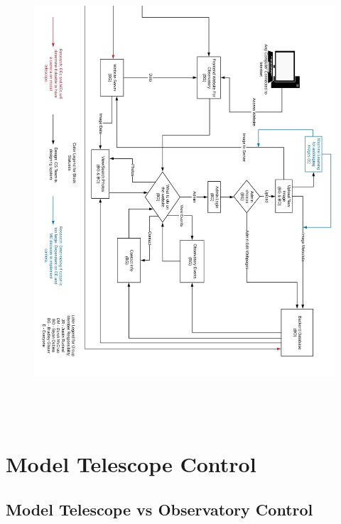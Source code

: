 \documentclass[12pt]{report}
\begin{document}
\begin{figure}[h]
	\centering
	\includegraphics[width=1.00\linewidth, height=17.0cm]{blockpt1}
\end{figure}

\newpage

\section*{Model Telescope Control}

\subsection*{Model Telescope vs Observatory Control}
\end{document}
